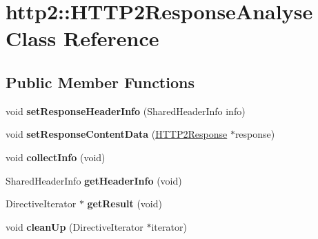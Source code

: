 \hypertarget{classhttp2_1_1HTTP2ResponseAnalyse}{}\section{http2\+:\+:H\+T\+T\+P2\+Response\+Analyse Class Reference}
\label{classhttp2_1_1HTTP2ResponseAnalyse}
\subsection*{Public Member Functions}
\begin{DoxyCompactItemize}
\item 
\mbox{\label{classhttp2_1_1HTTP2ResponseAnalyse_a87e4d8faa0f1132d0c24fd952be231dd}} 
void {\bfseries set\+Response\+Header\+Info} (Shared\+Header\+Info info)
\item 
\mbox{\label{classhttp2_1_1HTTP2ResponseAnalyse_a0fabbe7992b60e7862e869f92fcacce8}} 
void {\bfseries set\+Response\+Content\+Data} (\hyperlink{classhttp2_1_1HTTP2Response}{H\+T\+T\+P2\+Response} $\ast$response)
\item 
\mbox{\label{classhttp2_1_1HTTP2ResponseAnalyse_a45ef0d936974117a0a185fbffb87c588}} 
void {\bfseries collect\+Info} (void)
\item 
\mbox{\label{classhttp2_1_1HTTP2ResponseAnalyse_a1dcdcc4e334e781e733d11496b83795d}} 
Shared\+Header\+Info {\bfseries get\+Header\+Info} (void)
\item 
\mbox{\label{classhttp2_1_1HTTP2ResponseAnalyse_ac1dff2c9fe2ad344ca8aac5ad1772655}} 
Directive\+Iterator $\ast$ {\bfseries get\+Result} (void)
\item 
\mbox{\label{classhttp2_1_1HTTP2ResponseAnalyse_a02665892a9045550e30031cfa2c9a3d8}} 
void {\bfseries clean\+Up} (Directive\+Iterator $\ast$iterator)
\end{DoxyCompactItemize}
